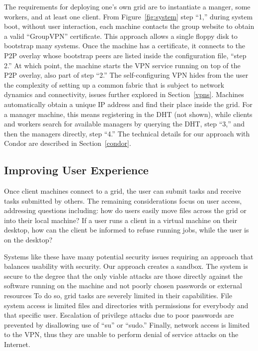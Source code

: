 \documentclass[conference]{IEEEtran}
\begin{document}
The requirements for deploying one's own grid are to instantiate a manger, some
workers, and at least one client.  From Figure~\ref{fig:system} step ``1,''
during system boot, without user interaction, each machine contacts the group
website to obtain a valid ``GroupVPN'' certificate.  This approach allows a
single floppy disk to bootstrap many systems.  Once the machine has a
certificate, it connects to the P2P overlay whose bootstrap peers are listed
inside the configuration file, ``step 2.''  At which point, the machine starts
the VPN service running on top of the P2P overlay, also part of step ``2.'' The
self-configuring VPN hides from the user the complexity of setting up a common
fabric that is subject to network dynamics and connectivity, issues further
explored in Section~\ref{vpns}.  Machines automatically obtain a unique IP
address and find their place inside the grid.  For a manager machine, this
means registering in the DHT (not shown), while clients and workers search for
available managers by querying the DHT, step ``3,'' and then the managers
directly, step ``4.''  The technical details for our approach with Condor are
described in Section~\ref{condor}.

\subsection{Improving User Experience}

Once client machines connect to a grid, the user can submit tasks and receive
tasks submitted by others.  The remaining considerations focus on user access,
addressing questions including: how do users easily move files across the grid
or into their local machine?  If a user runs a client in a virtual machine on
their desktop, how can the client be informed to refuse running jobs, while the
user is on the desktop?

Systems like these have many potential security issues requiring an approach
that balances usability with security.  Our approach creates a sandbox.  The
system is secure to the degree that the only viable attacks are those directly
against the software running on the machine and not poorly chosen passwords or
external resources To do so, grid tasks are severely limited in their
capabilities.  File system access is limited files and directories with
permissions for everybody and that specific user.  Escalation of privilege
attacks due to poor passwords are prevented by disallowing use of ``su'' or
``sudo.'' Finally, network access is limited to the VPN, thus they are unable
to perform denial of service attacks on the Internet.
\end{document}
